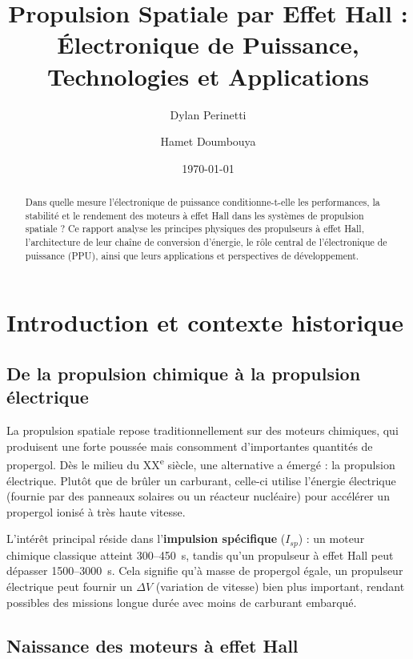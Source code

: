 \documentclass[12pt,a4paper]{article}
\title{Propulsion Spatiale par Effet Hall :\\
Électronique de Puissance, Technologies et Applications}
\author{Dylan Perinetti \and Hamet Doumbouya}
\date{\today}
\begin{document}
\maketitle

\begin{abstract}
Dans quelle mesure l'électronique de puissance conditionne-t-elle les performances, la stabilité et le rendement des moteurs à effet Hall dans les systèmes de propulsion spatiale ? Ce rapport analyse les principes physiques des propulseurs à effet Hall, l'architecture de leur chaîne de conversion d'énergie, le rôle central de l'électronique de puissance (PPU), ainsi que leurs applications et perspectives de développement.
\end{abstract}

\tableofcontents
\newpage

\section{Introduction et contexte historique}

\subsection{De la propulsion chimique à la propulsion électrique}

La propulsion spatiale repose traditionnellement sur des moteurs chimiques, qui produisent une forte poussée mais consomment d'importantes quantités de propergol. Dès le milieu du XX\textsuperscript{e} siècle, une alternative a émergé : la propulsion électrique. Plutôt que de brûler un carburant, celle-ci utilise l'énergie électrique (fournie par des panneaux solaires ou un réacteur nucléaire) pour accélérer un propergol ionisé à très haute vitesse.

L'intérêt principal réside dans l'\textbf{impulsion spécifique} ($I_{sp}$) : un moteur chimique classique atteint 300--450~s, tandis qu'un propulseur à effet Hall peut dépasser 1500--3000~s. Cela signifie qu'à masse de propergol égale, un propulseur électrique peut fournir un $\Delta V$ (variation de vitesse) bien plus important, rendant possibles des missions longue durée avec moins de carburant embarqué.

\subsection{Naissance des moteurs à effet Hall}
\end{document}

